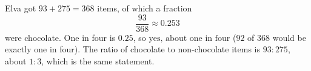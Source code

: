 Elva got $93+275=368$ items, of which a fraction
\[\dfrac{93}{368}\approx0.253\]
were chocolate. One in four is $0.25$, so $\boxed{\text{yes, about one in four}}$ ($92$ of $368$ would be exactly one in four). The ratio of chocolate to non-chocolate items is $93:275$, about $1:3$, which is the same statement.
